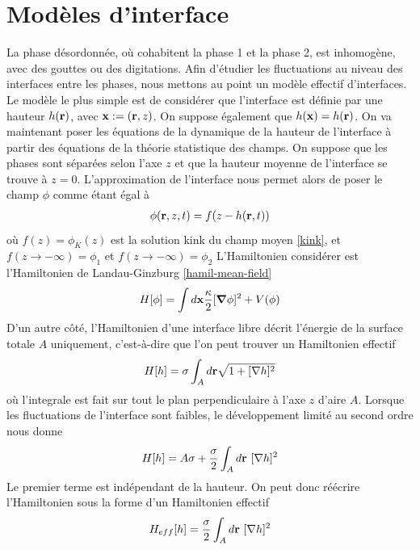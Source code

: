     \section{Modèles d'interface}
La phase désordonnée, où cohabitent la phase 1 et la phase 2, est inhomogène, avec des gouttes ou des digitations. Afin d'étudier les fluctuations au niveau des interfaces entre les phases, nous mettons au point un modèle effectif d'interfaces. Le modèle le plus simple est de considérer que l'interface est définie par une hauteur $h({\bf r})$, avec ${\bf x} := ({\bf r},z)$. On suppose également que $h({\bf x})=h({\bf r})$.  
On va maintenant poser les équations de la dynamique de la hauteur de l'interface à partir des équations de la théorie statistique des champs. On suppose que les phases sont séparées selon l'axe $z$ et que la hauteur moyenne de l'interface se trouve à $z=0$. L'approximation de l'interface nous permet alors de poser le champ $\phi$ comme étant égal à 
\begin{align}
    \phi({\bf r},z,t) = f(z-h({\bf r},t))
    \label{hans}
\end{align}
où $f(z)=\phi_K(z)$ est la solution kink du champ moyen \ref{kink}, et $f(z \to -\infty) = \phi_1$ et $f(z \to -\infty) = \phi_2$
L'Hamiltonien considérer est l'Hamiltonien de Landau-Ginzburg \ref{hamil-mean-field}
\begin{align}
    H[\phi] = \int d {\bf x}  \frac{\kappa}{2}[{\boldsymbol \nabla} \phi]^2 + V(\phi)
\end{align}
D'un autre côté, l'Hamiltonien d'une interface libre décrit l'énergie de la surface totale $A$ uniquement, c'est-à-dire que l'on peut trouver un Hamiltonien effectif
\begin{align}
    H[h] = \sigma \int_A d {\bf r}\sqrt{1+[\nabla h]^2}
\end{align}
où l'integrale est fait sur tout le plan perpendiculaire à l'axe $z$ d'aire $A$. Lorsque les fluctuations de l'interface sont faibles, le développement limité au second ordre nous donne
\begin{align}
    H[h]= A\sigma +\frac{\sigma}{2} \int_A d {\bf r} \ [\nabla h]^2
\end{align}
Le premier terme est indépendant de la hauteur. On peut donc réécrire l'Hamiltonien sous la forme d'un Hamiltonien effectif
\begin{align}
    H_{eff} [h]= \frac{\sigma}{2} \int_A d {\bf r}\  [\nabla h]^2
    \label{heff}
\end{align}


